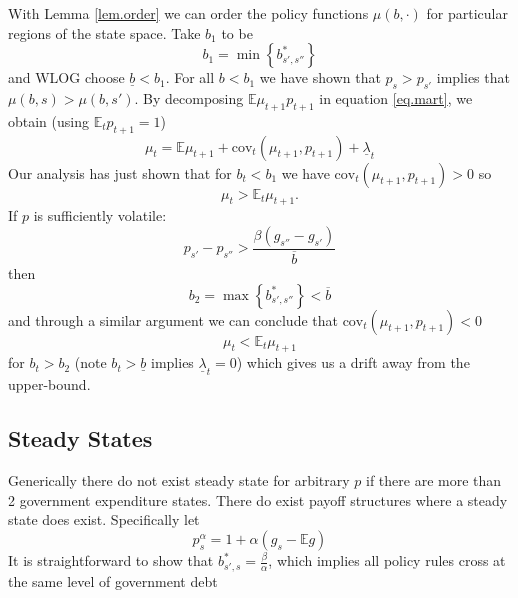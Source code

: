 \documentclass[12pt]{article}
\newcommand{\EE}{\mathbb E}
\newcommand{\cov}{\text{cov}}
\begin{document}
With Lemma \ref{lem.order} we can order the policy functions $\mu(b,\cdot)$ for particular regions of the state space.  Take $b_1$ to be
\[
	b_1 = \min\left\{b^*_{s',s''}\right\}
\] and WLOG choose $\underline b < b_1$.  For all $b < b_1$ we have shown that $p_s > p_{s'}$ implies that $\mu(b,s) > \mu(b,s')$.  By decomposing $\EE \mu_{t+1}p_{t+1}$ in equation \eqref{eq.mart}, we obtain (using $\EE_t p_{t+1} = 1$)
\begin{equation}
	\mu_t = \EE\mu_{t+1} +\cov_t(\mu_{t+1},p_{t+1}) + \underline \lambda_t
\end{equation}Our analysis has just shown that for $b_t < b_1$ we have $\cov_t (\mu_{t+1},p_{t+1})  >0$ so 
\[
	\mu_t > \EE_t\mu_{t+1}.
\]  If $p$ is sufficiently volatile:
\[
	p_{s'} - p_{s''} > \frac{\beta(g_{s''}-g_{s'})}{\overline b}
\] then 
\[
	b_2 = \max\left\{b^*_{s',s''}\right\} <\overline b
\] and through a similar argument  we can conclude that $\cov_t(\mu_{t+1},p_{t+1}) < 0$ 
\[
	\mu_t < \EE_t \mu_{t+1}
\] for $b_t > b_2$ (note $b_t >\underline b$ implies $\underline \lambda_t =0$) which gives us a drift away from the upper-bound. 
\subsection{Steady States}  Generically there do not exist steady state for arbitrary $p$ if there are more than 2 government expenditure states.  There do exist payoff structures where a steady state does exist.  Specifically let
\[
	p^\alpha_s = 1 + \alpha(g_s - \EE g)
\]It is straightforward to show that $b^*_{s',s} = \frac\beta\alpha$, which implies all policy rules cross at the same level of government debt
\end{document}
